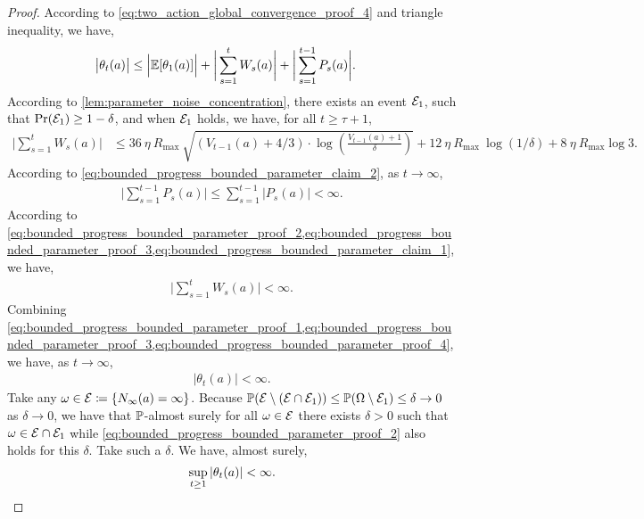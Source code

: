 \begin{proof}
According to \cref{eq:two_action_global_convergence_proof_4} and triangle inequality, we have,
\begin{align}
\label{eq:bounded_progress_bounded_parameter_proof_1}
    \big| \theta_t(a) \big| &\le \Big| \mathbb{E}[\theta_1(a)] \Big| + \bigg| \sum_{s=1}^{t}{W_s(a)} \bigg| + \bigg| \sum_{s=1}^{t-1}{P_s(a)} \bigg|.
\end{align}
According to 
\cref{lem:parameter_noise_concentration}, there exists an event ${\mathcal{E}}_1 $, such that $\operatorname*{Pr}({\mathcal{E}}_1 ) \ge 1- \delta$, and when ${\mathcal{E}}_1 $ holds, we have, for all $t \ge \tau+1$,
\begin{align}
\label{eq:bounded_progress_bounded_parameter_proof_2}
    \bigg| \sum_{s=1}^{t}{W_s(a)} \bigg| &\le 36 \ \eta \ R_{\max} \ \sqrt{  (V_{t-1}(a)+4/3) \cdot \log \left( \frac{  V_{t-1}(a)+1  }{ \delta } \right) } + 12 \ \eta \ R_{\max} \ \log(1/\delta) +  8 \ \eta \ R_{\max}\log 3.
\end{align}
According to \cref{eq:bounded_progress_bounded_parameter_claim_2}, as $t \to \infty$,
\begin{align}
\label{eq:bounded_progress_bounded_parameter_proof_3}
    \bigg| \sum_{s=1}^{t-1}{P_s(a)} \bigg| \le \sum_{s=1}^{t-1}{ \big| P_s(a) \big| } < \infty.
\end{align}
According to \cref{eq:bounded_progress_bounded_parameter_proof_2,eq:bounded_progress_bounded_parameter_proof_3,eq:bounded_progress_bounded_parameter_claim_1}, we have,
\begin{align}
\label{eq:bounded_progress_bounded_parameter_proof_4}
    \bigg| \sum_{s=1}^{t}{W_s(a)} \bigg| < \infty.
\end{align}
Combining \cref{eq:bounded_progress_bounded_parameter_proof_1,eq:bounded_progress_bounded_parameter_proof_3,eq:bounded_progress_bounded_parameter_proof_4}, we have, as $t \to \infty$,
\begin{align}
\label{eq:bounded_progress_bounded_parameter_proof_5}
    |\theta_t(a)| < \infty.
\end{align}
Take any $\omega \in {\mathcal{E}} \coloneqq \{ N_\infty(a) = \infty \}$. Because ${\mathbb{P}}{\left( {\mathcal{E}}  \setminus \left( {\mathcal{E}}  \cap {\mathcal{E}}_1  \right) \right)} \le {\mathbb{P}}{\left( \Omega \setminus {\mathcal{E}}_1  \right)} \le \delta \to 0$  as $\delta\to 0$, we have that ${\mathbb{P}}$-almost surely for all $\omega \in {\mathcal{E}} $
there exists $\delta > 0$ such that $\omega \in {\mathcal{E}} \cap {\mathcal{E}}_1 $
while
\cref{eq:bounded_progress_bounded_parameter_proof_2} also holds for this $\delta$.
Take such a $\delta$. We have, almost surely,
\begin{equation*}
    \sup_{t \ge 1}{ |\theta_t(a)| } < \infty. \qedhere
\end{equation*}
\end{proof}

